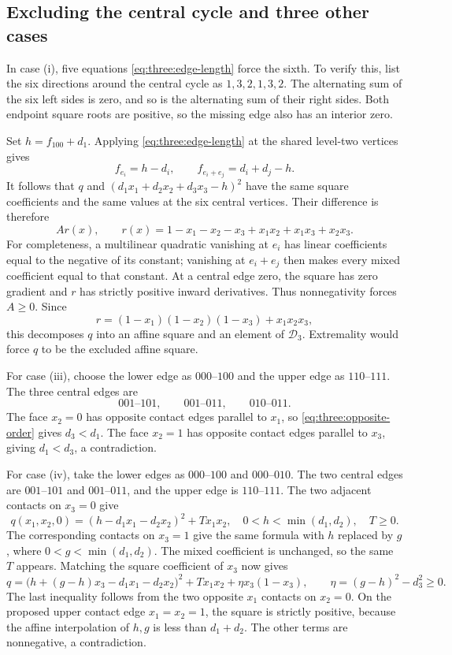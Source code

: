 \subsection{Excluding the central cycle and three other cases}

In case (i), five equations \eqref{eq:three:edge-length} force the sixth.
To verify this, list the six directions around the central cycle as
$1,3,2,1,3,2$. The alternating sum of the six left sides is zero, and so
is the alternating sum of their right sides. Both endpoint square roots
are positive, so the missing edge also has an interior zero.

Set $h=f_{100}+d_1$. Applying \eqref{eq:three:edge-length} at the shared
level-two vertices gives
\[
 f_{e_i}=h-d_i,\qquad
 f_{e_i+e_j}=d_i+d_j-h.
\]
It follows that $q$ and $(d_1x_1+d_2x_2+d_3x_3-h)^2$ have the same square
coefficients and the same values at the six central vertices. Their
difference is therefore
\[
 A r(x),\qquad
 r(x)=1-x_1-x_2-x_3+x_1x_2+x_1x_3+x_2x_3.
\]
For completeness, a multilinear quadratic vanishing at $e_i$ has linear
coefficients equal to the negative of its constant; vanishing at
$e_i+e_j$ then makes every mixed coefficient equal to that constant.
At a central edge zero, the square has zero gradient and $r$ has strictly
positive inward derivatives. Thus nonnegativity forces $A\ge0$.
Since
\[
 r=(1-x_1)(1-x_2)(1-x_3)+x_1x_2x_3,
\]
this decomposes $q$ into an affine square and an element of $\mathcal D_3$.
Extremality would force $q$ to be the excluded affine square.

For case (iii), choose the lower edge as $000$--$100$ and the upper edge
as $110$--$111$. The three central edges are
\[
 001\text{--}101,\qquad001\text{--}011,\qquad010\text{--}011.
\]
The face $x_2=0$ has opposite contact edges parallel to $x_1$, so
\eqref{eq:three:opposite-order} gives $d_3<d_1$. The face $x_2=1$ has
opposite contact edges parallel to $x_3$, giving $d_1<d_3$, a contradiction.

For case (iv), take the lower edges as $000$--$100$ and $000$--$010$.
The two central edges are $001$--$101$ and $001$--$011$, and the upper
edge is $110$--$111$. The two adjacent contacts on $x_3=0$ give
\[
 q(x_1,x_2,0)=(h-d_1x_1-d_2x_2)^2+T x_1x_2,
 \quad 0<h<\min(d_1,d_2),\quad T\ge0.
\]
The corresponding contacts on $x_3=1$ give the same formula with $h$
replaced by $g$, where $0<g<\min(d_1,d_2)$. The mixed coefficient is
unchanged, so the same $T$ appears. Matching the square coefficient of
$x_3$ now gives
\[
 q=\bigl(h+(g-h)x_3-d_1x_1-d_2x_2\bigr)^2
          +T x_1x_2+\eta x_3(1-x_3),\qquad
 \eta=(g-h)^2-d_3^2\ge0.
\]
The last inequality follows from the two opposite $x_1$ contacts on
$x_2=0$. On the proposed upper contact edge $x_1=x_2=1$, the square is
strictly positive, because the affine interpolation of $h,g$ is less
than $d_1+d_2$. The other terms are nonnegative, a contradiction.

